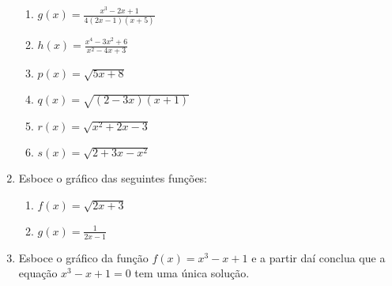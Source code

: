 \documentclass[12pt,a4paper]{article}
\newcommand{\ds}{\displaystyle}
\begin{document}
\begin{enumerate}
\begin{enumerate}
    \item $\ds g(x)=\frac{x^3-2x+1}{4(2x-1)(x+5)}$
    \item $\ds h(x)=\frac{x^4-3x^2+6}{x^2-4x+3}$
    \item $\ds p(x)=\sqrt{5x+8}$
    \item $\ds q(x)=\sqrt{(2-3x)(x+1)}$
    \item $\ds r(x)=\sqrt{x^2+2x-3}$
    \item $\ds s(x)=\sqrt{2+3x-x^2}$
  \end{enumerate}
  \item Esboce o gráfico das seguintes funções:
  \begin{enumerate}
    \item $f(x)=\sqrt{2x+3}$
    \item $\ds g(x)=\frac{1}{2x-1}$
  \end{enumerate}
  \item Esboce o gráfico da função $f(x)=x^3-x+1$ e a partir daí conclua que a equação $x^3-x+1=0$ tem uma única solução.
\end{enumerate}
\end{document}
